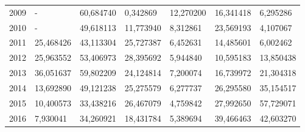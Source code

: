 \begin{table}
\begin{tabular}{p{1cm}p{2cm}p{2cm}p{2cm}p{2cm}p{2cm}p{2cm}}
 2009 &             - &                                    60,684740 &                                           0,342869 &                       12,270200 &                  16,341418 &          6,295286 \\
 2010 &             - &                                    49,618113 &                                          11,773940 &                        8,312861 &                  23,569193 &          4,107067 \\
 2011 &     25,468426 &                                    43,113304 &                                          25,727387 &                        6,452631 &                  14,485601 &          6,002462 \\
 2012 &     25,963552 &                                    53,406973 &                                          28,395692 &                        5,944840 &                  10,595183 &         13,850438 \\
 2013 &     36,051637 &                                    59,802209 &                                          24,124814 &                        7,200074 &                  16,739972 &         21,304318 \\
 2014 &     13,692890 &                                    49,121238 &                                          25,275579 &                        6,277737 &                  26,295580 &         35,154517 \\
 2015 &     10,400573 &                                    33,438216 &                                          26,467079 &                        4,759842 &                  27,992650 &         57,729071 \\
 2016 &      7,930041 &                                    34,260921 &                                          18,431784 &                        5,389694 &                  39,466463 &         42,603270 \\
\bottomrule
\end{tabular}
\end{table}
